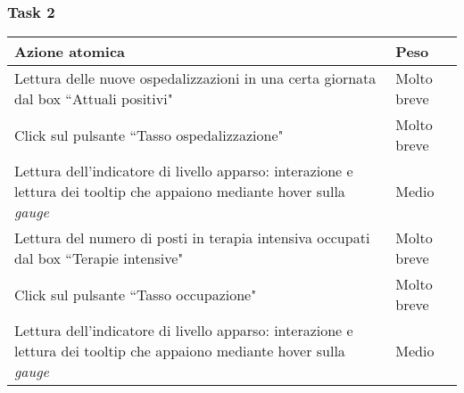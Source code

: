 \subsubsection{Task 2}
\label{sss:iaa-task-2}

{
\renewcommand{\arraystretch}{2}
\begin{longtable}[h]{| p{14cm} | p{2.5cm} |}
    \hline
    \textbf{Azione atomica} & \textbf{Peso} \\
    \hline
    \endhead
    Lettura delle nuove ospedalizzazioni in una certa giornata dal box ``Attuali positivi" & Molto breve \\
    \hline
    Click sul pulsante ``Tasso ospedalizzazione" & Molto breve \\
    \hline
    Lettura dell'indicatore di livello apparso: interazione e lettura dei tooltip che appaiono mediante hover sulla \textit{gauge} & Medio \\
    \hline
    Lettura del numero di posti in terapia intensiva occupati dal box ``Terapie intensive" & Molto breve \\
    \hline
    Click sul pulsante ``Tasso occupazione" & Molto breve \\
    \hline
    Lettura dell'indicatore di livello apparso: interazione e lettura dei tooltip che appaiono mediante hover sulla \textit{gauge} & Medio \\
    \hline
\end{longtable}
}
